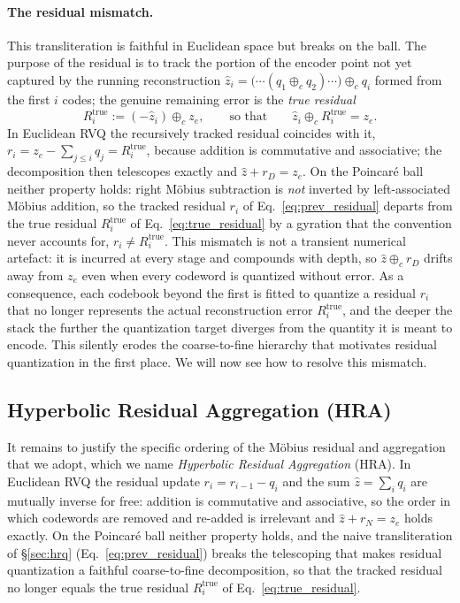 \documentclass[12pt]{report}
\begin{document}
\paragraph{The residual mismatch.} This transliteration is faithful in Euclidean space but breaks on the ball. The purpose of the residual is to track the portion of the encoder point not yet captured by the running reconstruction $\hat z_i = \big(\cdots(q_1\oplus_c q_2)\cdots\big)\oplus_c q_i$ formed from the first $i$ codes; the genuine remaining error is the \emph{true residual}
\begin{equation}
    \label{eq:true_residual}
    R_i^{\text{true}} := (-\hat z_i)\oplus_c z_e,
    \qquad\text{so that}\qquad
    \hat z_i \oplus_c R_i^{\text{true}} = z_e .
\end{equation}
In Euclidean RVQ the recursively tracked residual coincides with it, $r_i = z_e - \sum_{j\le i} q_j = R_i^{\text{true}}$, because addition is commutative and associative; the decomposition then telescopes exactly and $\hat z + r_D = z_e$. On the Poincar\'e ball neither property holds: right M\"obius subtraction is \emph{not} inverted by left-associated M\"obius addition, so the tracked residual $r_i$ of Eq.~\ref{eq:prev_residual} departs from the true residual $R_i^{\text{true}}$ of Eq.~\ref{eq:true_residual} by a gyration that the convention never accounts for, $r_i \neq R_i^{\text{true}}$. This mismatch is not a transient numerical artefact: it is incurred at every stage and compounds with depth, so $\hat z\oplus_c r_D$ drifts away from $z_e$ even when every codeword is quantized without error. As a consequence, each codebook beyond the first is fitted to quantize a residual $r_i$ that no longer represents the actual reconstruction error $R_i^{\text{true}}$, and the deeper the stack the further the quantization target diverges from the quantity it is meant to encode. This silently erodes the coarse-to-fine hierarchy that motivates residual quantization in the first place. We will now see how to resolve this mismatch.

\subsection{Hyperbolic Residual Aggregation (HRA)}
\label{sec:newmethod}
It remains to justify the specific ordering of the M\"obius residual and aggregation that we adopt, which we name \emph{Hyperbolic Residual Aggregation} (HRA). In Euclidean RVQ the residual update $r_i = r_{i-1}-q_i$ and the sum $\hat z=\sum_i q_i$ are mutually inverse for free: addition is commutative and associative, so the order in which codewords are removed and re-added is irrelevant and $\hat z + r_N = z_e$ holds exactly. On the Poincar\'e ball neither property holds, and the naive transliteration of \S\ref{sec:hrq} (Eq.~\ref{eq:prev_residual}) breaks the telescoping that makes residual quantization a faithful coarse-to-fine decomposition, so that the tracked residual no longer equals the true residual $R_i^{\text{true}}$ of Eq.~\ref{eq:true_residual}.
\end{document}
